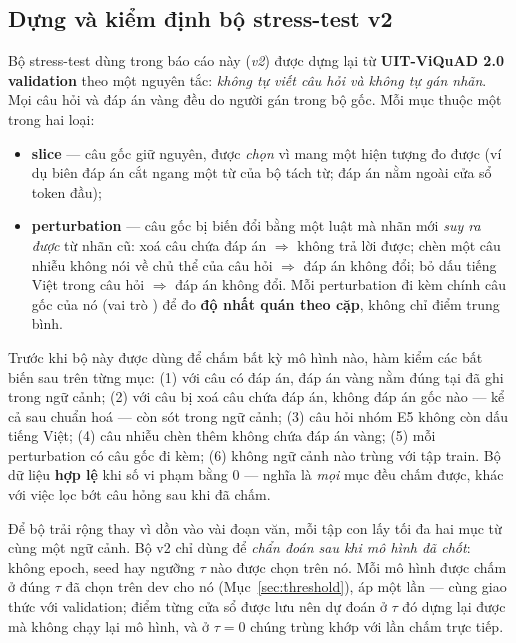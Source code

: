 \subsection{Dựng và kiểm định bộ stress-test v2}
\label{sec:audit-method}

Bộ stress-test dùng trong báo cáo này (\emph{v2}) được dựng lại từ \textbf{UIT-ViQuAD 2.0
validation} theo một nguyên tắc: \emph{không tự viết câu hỏi và không tự gán nhãn}. Mọi câu hỏi
và đáp án vàng đều do người gán trong bộ gốc. Mỗi mục thuộc một trong hai loại:

\begin{itemize}
  \item \textbf{slice} --- câu gốc giữ nguyên, được \emph{chọn} vì mang một hiện tượng đo được
        (ví dụ biên đáp án cắt ngang một từ của bộ tách từ; đáp án nằm ngoài cửa sổ token đầu);
  \item \textbf{perturbation} --- câu gốc bị biến đổi bằng một luật mà nhãn mới \emph{suy ra
        được} từ nhãn cũ: xoá câu chứa đáp án $\Rightarrow$ không trả lời được; chèn một câu
        nhiễu không nói về chủ thể của câu hỏi $\Rightarrow$ đáp án không đổi; bỏ dấu tiếng Việt
        trong câu hỏi $\Rightarrow$ đáp án không đổi. Mỗi perturbation đi kèm chính câu gốc của
        nó (vai trò ) để đo \textbf{độ nhất quán theo cặp}, không chỉ điểm trung bình.
\end{itemize}

Trước khi bộ này được dùng để chấm bất kỳ mô hình nào, hàm  kiểm các
bất biến sau trên từng mục: (1) với câu có đáp án, đáp án vàng nằm đúng tại 
đã ghi trong ngữ cảnh; (2) với câu bị xoá câu chứa đáp án, không đáp án gốc nào --- kể cả sau
chuẩn hoá --- còn sót trong ngữ cảnh; (3) câu hỏi nhóm E5 không còn dấu tiếng Việt; (4) câu nhiễu
chèn thêm không chứa đáp án vàng; (5) mỗi perturbation có câu gốc đi kèm; (6) không ngữ cảnh nào
trùng với tập train. Bộ dữ liệu \textbf{hợp lệ} khi số vi phạm bằng 0 --- nghĩa là \emph{mọi} mục
đều chấm được, khác với việc lọc bớt câu hỏng sau khi đã chấm.

Để bộ trải rộng thay vì dồn vào vài đoạn văn, mỗi tập con lấy tối đa hai mục từ cùng một ngữ
cảnh. Bộ v2 chỉ dùng để \emph{chẩn đoán sau khi mô hình đã chốt}: không epoch, seed hay ngưỡng
$\tau$ nào được chọn trên nó. Mỗi mô hình được chấm ở đúng $\tau$ đã chọn trên dev cho nó
(Mục~\ref{sec:threshold}), áp một lần --- cùng giao thức với validation; điểm từng cửa sổ được lưu
nên dự đoán ở $\tau$ đó dựng lại được mà không chạy lại mô hình, và ở $\tau = 0$ chúng trùng khớp
với lần chấm trực tiếp.

